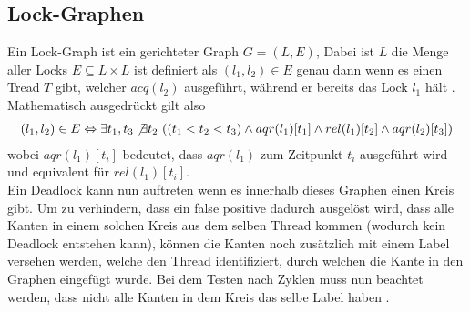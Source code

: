 \subsection*{Lock-Graphen}
Ein Lock-Graph ist ein gerichteter Graph $G = (L, E)$, Dabei ist $L$ die Menge aller Locks $E \subseteq L \times L$ ist definiert als $(l_1, l_2) \in E$ genau dann wenn es einen Tread $T$ gibt, welcher $acq(l_2)$ ausgeführt, während er bereits das Lock $l_1$ hält \cite{bensalem}. Mathematisch ausgedrückt gilt also 
\begin{align*}
    (l_1, l_2) \in E \Leftrightarrow \exists t_1, t_3 \not\exists t_2\ ((t_1 < t_2 < t_3) \land aqr(l_1)[t_1] \land rel(l_1)[t_2] \land  aqr(l_2)[t_3])
\end{align*}
wobei $aqr(l_1)[t_i]$ bedeutet, dass $aqr(l_1)$ zum Zeitpunkt $t_i$ ausgeführt wird und equivalent für $rel(l_1)[t_i]$.\\
Ein Deadlock kann nun auftreten wenn es innerhalb dieses Graphen einen Kreis gibt. Um zu verhindern, dass ein false positive dadurch ausgelöst wird, dass alle Kanten in einem solchen Kreis aus dem selben Thread kommen (wodurch kein Deadlock entstehen kann), können die Kanten noch zusätzlich mit einem Label versehen werden, welche den Thread identifiziert, durch welchen die Kante in den Graphen eingefügt wurde. Bei dem Testen nach Zyklen muss nun beachtet werden, dass nicht alle Kanten in dem Kreis das selbe Label haben \cite{bensalem}. 

